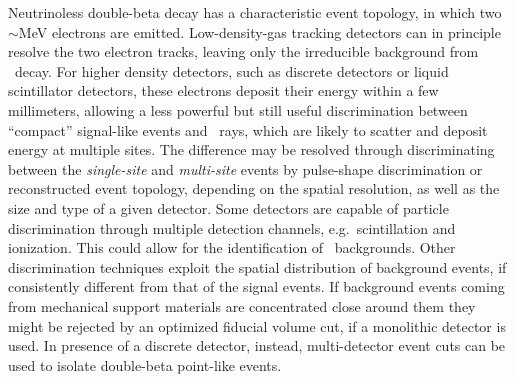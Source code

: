 Neutrinoless double-beta decay has a characteristic event topology, in which two $\sim$MeV
electrons are emitted. Low-density-gas tracking detectors can in principle resolve the two
electron tracks, leaving only the irreducible background from \nnbb\ decay. For higher
density detectors, such as discrete detectors or liquid scintillator detectors, these
electrons deposit their energy within a few millimeters, allowing a less powerful but
still useful discrimination between ``compact'' signal-like events and \g\ rays, which are
likely to scatter and deposit energy at multiple sites. The difference may be resolved
through discriminating between the \emph{single-site} and \emph{multi-site} events by
pulse-shape discrimination or reconstructed event topology, depending on the spatial
resolution, as well as the size and type of a given detector.  Some detectors are capable
of particle discrimination through multiple detection channels, e.g.~scintillation and
ionization. This could allow for the identification of \a\ backgrounds. Other
discrimination techniques exploit the spatial distribution of background events, if
consistently different from that of the signal events. If background events coming from
mechanical support materials are concentrated close around them they might be rejected by
an optimized fiducial volume cut, if a monolithic detector is used. In presence of a
discrete detector, instead, multi-detector event cuts can be used to isolate double-beta
point-like events.


